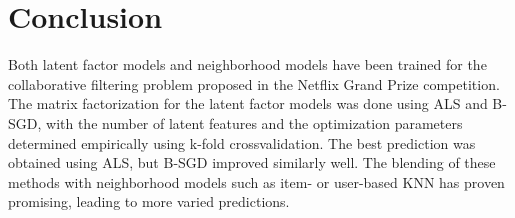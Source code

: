 \section{Conclusion}

Both latent factor models and neighborhood models have been trained for the 
collaborative filtering problem proposed in the Netflix Grand Prize competition.
The matrix factorization for the latent factor models was done using ALS and
B-SGD, with the number of latent features and the optimization parameters
determined empirically using k-fold crossvalidation. 
The best prediction was obtained using ALS, but B-SGD improved similarly well.
The blending of these methods with neighborhood models such as item- or
user-based KNN has proven promising, leading to more varied predictions.  
